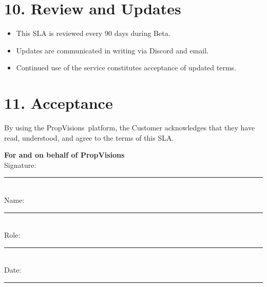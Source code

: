 \documentclass[11pt,a4paper]{article}
\newcommand{\product}{PropVisions}
\begin{document}
\section*{10. Review and Updates}
\begin{itemize}[left=0pt]
  \item This SLA is reviewed every 90 days during Beta.
  \item Updates are communicated in writing via Discord and email.
  \item Continued use of the service constitutes acceptance of updated terms.
\end{itemize}

\section*{11. Acceptance}
By using the \product\ platform, the Customer acknowledges that they have read, understood, and agree to the terms of this SLA.

\vspace{1cm}
\noindent \textbf{For and on behalf of \product} \\[12pt]

Signature: \rule{6cm}{0.4pt} \\
Name: \rule{6cm}{0.4pt} \\
Role: \rule{6cm}{0.4pt} \\
Date: \rule{6cm}{0.4pt} \\
\end{document}
